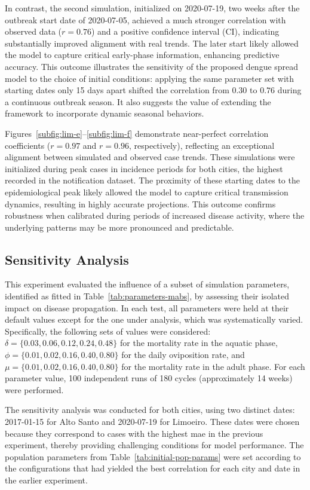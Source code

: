 In contrast, the second simulation, initialized on 2020-07-19, two weeks after the outbreak start date of 2020-07-05, achieved a much stronger correlation with observed data ($r = 0.76$) and a positive confidence interval (CI), indicating substantially improved alignment with real trends. The later start likely allowed the model to capture critical early-phase information, enhancing predictive accuracy. This outcome illustrates the sensitivity of the proposed dengue spread model to the choice of initial conditions: applying the same parameter set with starting dates only 15 days apart shifted the correlation from $0.30$ to $0.76$ during a continuous outbreak season. It also suggests the value of extending the framework to incorporate dynamic seasonal behaviors.


Figures~\ref{subfig:lim-e}--\ref{subfig:lim-f}  demonstrate near-perfect correlation coefficients ($r = 0.97$ and $r = 0.96$, respectively), reflecting an exceptional alignment between simulated and observed case trends. These simulations were initialized during peak cases in incidence periods for both cities, the highest recorded in the notification dataset. The proximity of these starting dates to the epidemiological peak likely allowed the model to capture critical transmission dynamics, resulting in highly accurate projections. This outcome confirms robustness when calibrated during periods of increased disease activity, where the underlying patterns may be more pronounced and predictable.

\subsection{Sensitivity Analysis}

This experiment evaluated the influence of a subset of simulation parameters, identified as fitted in Table~\ref{tab:parameters-mabs}, by assessing their isolated impact on disease propagation. In each test, all parameters were held at their default values except for the one under analysis, which was systematically varied. Specifically, the following sets of values were considered: $\delta = \{0.03, 0.06, 0.12, 0.24, 0.48\}$ for the mortality rate in the aquatic phase, $\phi = \{0.01, 0.02, 0.16, 0.40, 0.80\}$ for the daily oviposition rate, and $\mu = \{0.01, 0.02, 0.16, 0.40, 0.80\}$ for the mortality rate in the adult phase. For each parameter value, 100 independent runs of 180 cycles (approximately 14 weeks) were performed.

The sensitivity analysis was conducted for both cities, using two distinct dates: 2017-01-15 for Alto Santo and 2020-07-19 for Limoeiro. These dates were chosen because they correspond to cases with the highest \gls{mae} in the previous experiment, thereby providing challenging conditions for model performance. The population parameters from Table~\ref{tab:initial-pop-params} were set according to the configurations that had yielded the best correlation for each city and date in the earlier experiment.

